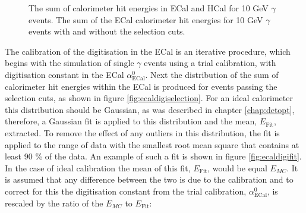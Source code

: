 \begin{figure}[h!]
\caption[\protect{} The sum of calorimeter hit energies in ECal and HCal for 10 GeV $\gamma$ events.  \protect{} The sum of the ECal calorimeter hit energies for 10 GeV $\gamma$ events with and without the selection cuts.]{\protect{} The sum of calorimeter hit energies in ECal and HCal for 10 GeV $\gamma$ events.  \protect{} The sum of the ECal calorimeter hit energies for 10 GeV $\gamma$ events with and without the selection cuts.}
\label{fig:ecaldigi}
\end{figure}

The calibration of the digitisation in the ECal is an iterative procedure, which begins with the simulation of single $\gamma$ events using a trial calibration, with digitisation constant in the ECal $\alpha^{0}_{\text{ECal}}$.  Next the distribution of the sum of calorimeter hit energies within the ECal is produced for events passing the selection cuts, as shown in figure \ref{fig:ecaldigiselection}.  For an ideal calorimeter this distribution should be Gaussian, as was described in chapter \ref{chap:detopt}, therefore, a Gaussian fit is applied to this distribution and the mean, $E_{\text{Fit}}$, extracted.  To remove the effect of any outliers in this distribution, the fit is applied to the range of data with the smallest root mean square that contains at least 90 \% of the data.  An example of such a fit is shown in figure \ref{fig:ecaldigifit}.  In the case of ideal calibration the mean of this fit, $E_{\text{Fit}}$, would be equal $E_{MC}$.  It is assumed that any difference between the two is due to the calibration and to correct for this the digitisation constant from the trial calibration, $\alpha^{0}_{\text{ECal}}$, is rescaled by the ratio of the $E_{MC}$ to $E_{\text{Fit}}$:


